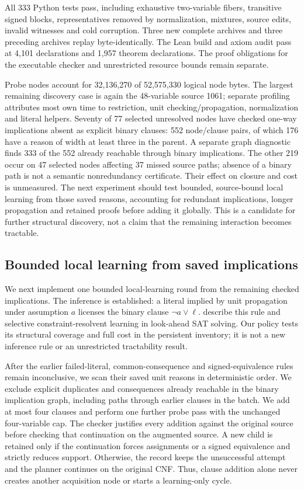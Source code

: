 \documentclass[11pt,a4paper]{article}
\numberwithin{equation}{section}
\theoremstyle{plain}
\theoremstyle{definition}
\theoremstyle{remark}
\begin{document}
All 333 Python tests pass, including exhaustive two-variable fibers, transitive signed blocks, representatives removed by normalization, mixtures, source edits, invalid witnesses and cold corruption. Three new complete archives and three preceding archives replay byte-identically. The Lean build and axiom audit pass at 4,101 declarations and 1,957 theorem declarations. The proof obligations for the executable checker and unrestricted resource bounds remain separate.

Probe nodes account for 32,136,270 of 52,575,330 logical node bytes. The largest remaining discovery case is again the 48-variable source 1061; separate profiling attributes most own time to restriction, unit checking/propagation, normalization and literal helpers. Seventy of 77 selected unresolved nodes have checked one-way implications absent as explicit binary clauses: 552 node/clause pairs, of which 176 have a reason of width at least three in the parent. A separate graph diagnostic finds 333 of the 552 already reachable through binary implications. The other 219 occur on 47 selected nodes affecting 37 missed source paths; absence of a binary path is not a semantic nonredundancy certificate. Their effect on closure and cost is unmeasured. The next experiment should test bounded, source-bound local learning from those saved reasons, accounting for redundant implications, longer propagation and retained proofs before adding it globally. This is a candidate for further structural discovery, not a claim that the remaining interaction becomes tractable.

\subsection{Bounded local learning from saved implications}
\label{sec:probe-learning}

We next implement one bounded local-learning round from the remaining checked implications. The inference is established: a literal implied by unit propagation under assumption $a$ licenses the binary clause $\neg a\vee\ell$. \citet{heule2005marcheq} describe this rule and selective constraint-resolvent learning in look-ahead SAT solving. Our policy tests its structural coverage and full cost in the persistent inventory; it is not a new inference rule or an unrestricted tractability result.

After the earlier failed-literal, common-consequence and signed-equivalence rules remain inconclusive, we scan their saved unit reasons in deterministic order. We exclude explicit duplicates and consequences already reachable in the binary implication graph, including paths through earlier clauses in the batch. We add at most four clauses and perform one further probe pass with the unchanged four-variable cap. The checker justifies every addition against the original source before checking that continuation on the augmented source. A new child is retained only if the continuation forces assignments or a signed equivalence and strictly reduces support. Otherwise, the record keeps the unsuccessful attempt and the planner continues on the original CNF. Thus, clause addition alone never creates another acquisition node or starts a learning-only cycle.
\end{document}
